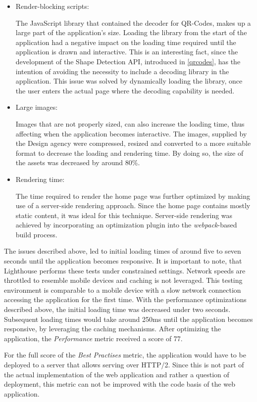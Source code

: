 \begin{itemize}
\item Render-blocking scripts:

The JavaScript library that contained the decoder for QR-Codes, makes up a large part of the application's size. Loading the library from the start of the application had a negative impact on the loading time required until the application is drawn and interactive. This is an interesting fact, since the development of the Shape Detection API, introduced in \ref{qrcodes}, has the intention of avoiding the necessity to include a decoding library in the application. This issue was solved by dynamically loading the library, once the user enters the actual page where the decoding capability is needed.
\item Large images:

Images that are not properly sized, can also increase the loading time, thus affecting when the application becomes interactive. The images, supplied by the Design agency were compressed, resized and converted to a more suitable format to decrease the loading and rendering time. By doing so, the size of the assets was decreased by around 80\%.

\item Rendering time:

The time required to render the home page was further optimized by making use of a server-side rendering approach. Since the home page contains mostly static content, it was ideal for this technique. Server-side rendering was achieved by incorporating an optimization plugin into the \textit{webpack}-based build process.
\end{itemize}
The issues described above, led to initial loading times of around five to seven seconds until the application becomes responsive. It is important to note, that Lighthouse performs these tests under constrained settings. Network speeds are throttled to resemble mobile devices and caching is not leveraged. This testing environment is comparable to a mobile device with a slow network connection accessing the application for the first time. With the performance optimizations described above, the initial loading time was decreased under two seconds. Subsequent loading times would take around 250ms until the application becomes responsive, by leveraging the caching mechanisms.
After optimizing the application, the \textit{Performance} metric received a score of 77.

For the full score of the \textit{Best Practises} metric, the application would have to be deployed to a server that allows serving over HTTP/2. Since this is not part of the actual implementation of the web application and rather a question of deployment, this metric can not be improved with the code basis of the web application.

